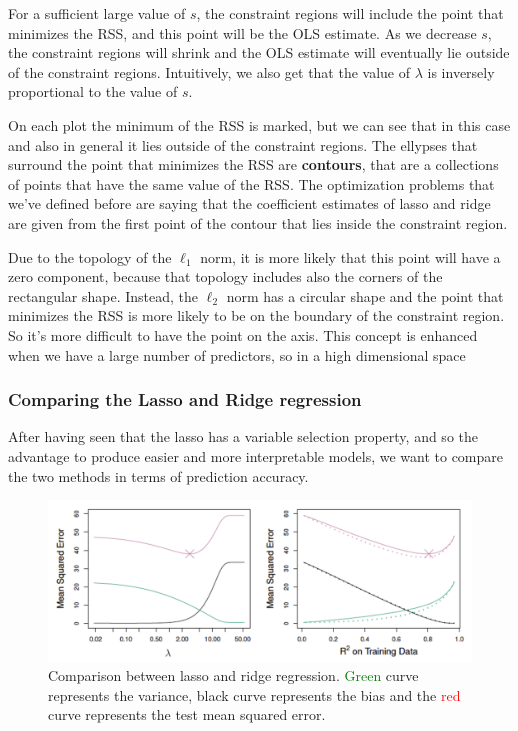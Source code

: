 For a sufficient large value of $s$, the constraint regions will include the point that minimizes the RSS, and this point will be the OLS estimate. As we decrease $s$, the constraint regions will shrink and the OLS estimate will eventually lie outside of the constraint regions.
Intuitively, we also get that the value of $\lambda$ is inversely proportional to the value of $s$.

On each plot the minimum of the RSS is marked, but we can see that in this case and also in general it lies outside of the constraint regions.
The ellypses that surround the point that minimizes the RSS are \textbf{contours}, that are a collections of points that have the same value of the RSS. The optimization problems that we've defined before are saying that the coefficient estimates of lasso and ridge are given from the first point of the contour that lies inside the constraint region.

Due to the topology of the $\ell_1$ norm, it is more likely that this point will have a zero component, because that topology includes also the corners of the rectangular shape. Instead, the $\ell_2$ norm has a circular shape and the point that minimizes the RSS is more likely to be on the boundary of the constraint region. So it's more difficult to have the point on the axis.
This concept is enhanced when we have a large number of predictors, so in a high dimensional space

\subsubsection*{Comparing the Lasso and Ridge regression}
After having seen that the lasso has a variable selection property, and so the advantage to produce easier and more interpretable models, we want to compare the two methods in terms of prediction accuracy.

\begin{figure}
    \centering
    \includegraphics[width=0.8\linewidth]{./figures/chapter_4/lassoridgecomparison.png}
    \caption{Comparison between lasso and ridge regression. \textcolor{green}{Green} curve represents the variance, black curve represents the bias and the \textcolor{red}{red} curve represents the test mean squared error.}
    \label{fig:lassoridgecomparison}
\end{figure}

